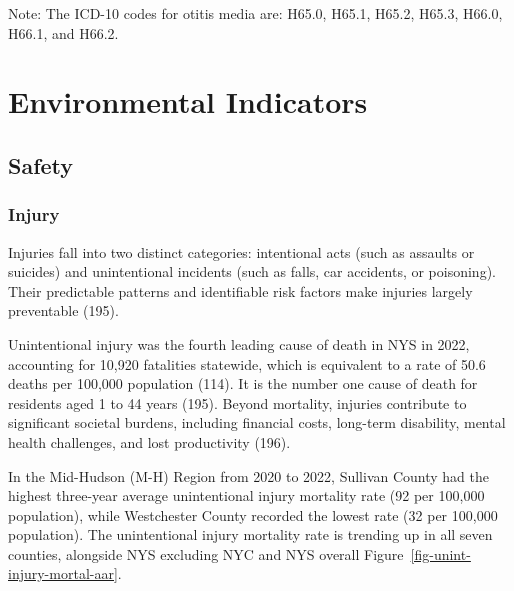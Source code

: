 \documentclass[
  english,
  letterpaper,
]{report}
\begin{document}
\begin{tcolorbox}[enhanced jigsaw, breakable, leftrule=.75mm, title=\textcolor{quarto-callout-note-color}{\faInfo}\hspace{0.5em}{Note}, bottomrule=.15mm, opacityback=0, left=2mm, colback=white, bottomtitle=1mm, coltitle=black, colbacktitle=quarto-callout-note-color!10!white, colframe=quarto-callout-note-color-frame, opacitybacktitle=0.6, toptitle=1mm, titlerule=0mm, arc=.35mm, rightrule=.15mm, toprule=.15mm]

Note: The ICD-10 codes for otitis media are: H65.0, H65.1, H65.2, H65.3,
H66.0, H66.1, and H66.2.

\end{tcolorbox}


\chapter{Environmental Indicators}\label{environmental-indicators}

\section{Safety}\label{safety}

\subsection{Injury}\label{injury}

Injuries fall into two distinct categories: intentional acts (such as
assaults or suicides) and unintentional incidents (such as falls, car
accidents, or poisoning). Their predictable patterns and identifiable
risk factors make injuries largely preventable (195).

Unintentional injury was the fourth leading cause of death in NYS in
2022, accounting for 10,920 fatalities statewide, which is equivalent to
a rate of 50.6 deaths per 100,000 population (114). It is the number one
cause of death for residents aged 1 to 44 years (195). Beyond mortality,
injuries contribute to significant societal burdens, including financial
costs, long-term disability, mental health challenges, and lost
productivity (196).

In the Mid-Hudson (M-H) Region from 2020 to 2022, Sullivan County had
the highest three-year average unintentional injury mortality rate (92
per 100,000 population), while Westchester County recorded the lowest
rate (32 per 100,000 population). The unintentional injury mortality
rate is trending up in all seven counties, alongside NYS excluding NYC
and NYS overall Figure~\ref{fig-unint-injury-mortal-aar}.
\end{document}
